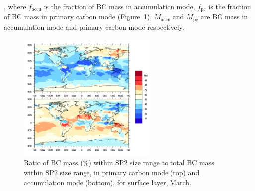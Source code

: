 \documentclass[11pt]{article}
\begin{document}
\noindent , where $f_{\text{accu}}$ is the fraction of BC mass in accumulation mode, $f_{\text{pc}}$ is the fraction of BC mass in primary carbon mode (Figure~\ref{fig_P3}), $M_{\text{accu}}$ and $M_{\text{pc}}$ are BC mass in accumulation mode and primary carbon mode respectively.

\begin{figure}[!h] 
	\begin{center}
		\includegraphics[width = 0.6\textwidth]{Rplot03}
		\caption[]{\label{fig_P3} Ratio of BC mass ($\%$) within SP2 size range to total BC mass within SP2 size range, in primary carbon mode (top) and accumulation mode (bottom), for surface layer, March.}
	\end{center}
\end{figure}











\end{document}
